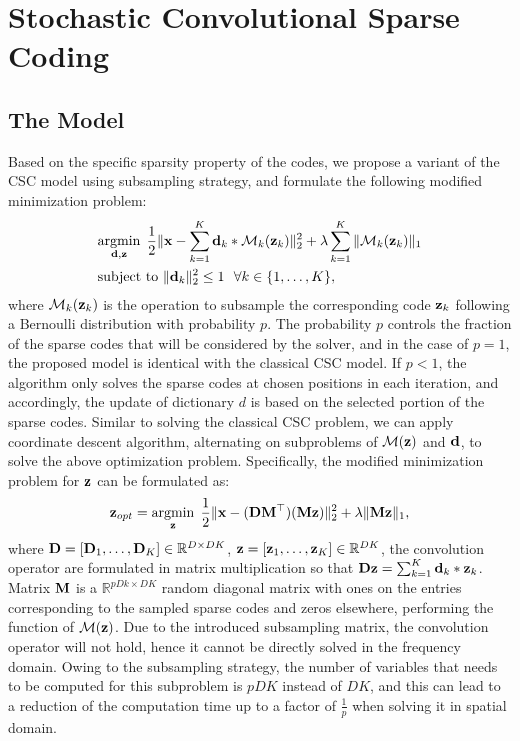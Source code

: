 \section{Stochastic Convolutional Sparse Coding}
\subsection{The Model}
Based on the specific sparsity property of the codes, we propose a variant of the CSC model using subsampling strategy,
and formulate the following modified minimization problem:
\begin{align}
    &\minimize{\filter,\code}  \frac{1}{2}\|\signal - \sum_{k=1}^{K} \filter_k * \mathcal{M}_k(\code_k) \|_2^2 + \lambda \sum_{k=1}^{K}\| \mathcal{M}_k(\code_k) \|_1  \nonumber \\
    &\text{subject to} ~ \|\filter_k\|^2_2 \leq 1 ~~ \forall k \in \{1,\dots,K\},
\end{align}
where $\mathcal{M}_k(\code_k)$ is the operation to subsample the corresponding code $\code_k$ following a Bernoulli distribution with probability $p$. The probability $p$ controls the fraction of the sparse codes that will be considered by the solver, and in the case of $p=1$, the proposed model is identical with the classical CSC model. If $p<1$, the algorithm only solves the sparse codes at chosen positions in each iteration, and accordingly, the update of dictionary $d$ is based on the selected portion of the sparse codes. Similar to solving the classical CSC problem, we can apply coordinate descent algorithm, alternating on subproblems of $\mathcal{M}(\code)$ and $\filter$, to solve the above optimization problem. Specifically, the modified minimization problem for $\code$ can be formulated as:
\begin{equation} \label{eq:updatingCode}
    \code_{opt} = \minimize{\code} \frac{1}{2}\|\signal - (\Filter \mask^\top)(\mask \code) \|_2^2 + \lambda \|\mask \code\|_1,
\end{equation}
where $\Filter = [\Filter_1, \dots, \Filter_K] \in \mathbb{R}^{D \times DK}$, $\code = [\code_1, \dots, \code_K] \in \mathbb{R}^{DK}$, the convolution operator are formulated in matrix multiplication so that $ \Filter \code = \sum_{k=1}^{K} \filter_k * \code_k$.  Matrix $\mask$ is a $\mathbb{R}^{pDk \times DK}$ random diagonal matrix with ones on the entries corresponding to the sampled sparse codes and zeros elsewhere, performing the function of $\mathcal{M}(\code)$. Due to the introduced subsampling matrix, the convolution operator will not hold, hence it cannot be directly solved in the frequency domain. Owing to the subsampling strategy, the number of variables that needs to be computed for this subproblem is $pDK$ instead of $DK$, and this can lead to a reduction of the computation time up to a factor of $\frac{1}{p}$ when solving it in spatial domain.

